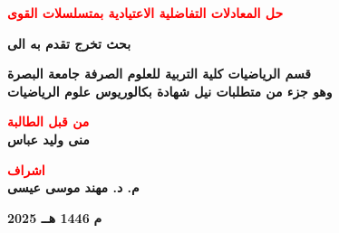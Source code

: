 \begin{titlepage}
	\vspace{1cm}
	
	\begin{center}
		\large \textbf{\textcolor{red}{حل المعادلات التفاضلية الاعتيادية بمتسلسلات القوى}}\\
		\large \textbf{\LR{\textcolor{red}{Solving Ordinary Differential Equations by Power Series}}}
	\end{center}
	\vfill
	
	\begin{center}
		\large
		\textbf{بحث تخرج تقدم به الى}
	\end{center}
	
	\begin{center}
		\large
		\textbf{قسم الرياضيات كلية التربية للعلوم الصرفة جامعة البصرة\\
			\vspace{6pt}
			وهو جزء من متطلبات نيل شهادة بكالوريوس علوم الرياضيات}
	\end{center}
	\vfill
	\begin{center}
		\large
\textbf{\textcolor{red}{من قبل الطالبة}}\\
		\vspace{8pt}
		\large
		\textbf{منى وليد عباس}
	\end{center}
	\vspace{10pt}
	\begin{center}
		\large
\textbf{\textcolor{red}{اشراف}}\\
		\vspace{8pt}
		\large
		\textbf{م. د. مهند موسى عيسى}
	\end{center}
	\vspace{80pt}
	\begingroup
	\large{\raggedleft \textbf{2025 م}} {\hfill \textbf{1446 هــ}}
	\endgroup
\end{titlepage}
\restoregeometry